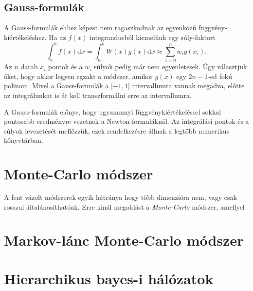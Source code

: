 \documentclass[12pt]{article}
\theoremstyle{plain}
\begin{document}
\subsection{Gauss-formulák}
A Gauss-formulák ehhez képest nem ragaszkodnak az egyenközű függvény-kiértékeléshez. Ha az $f(x)$ integrandusból kiemelünk egy súly-faktort
\begin{equation}
    \label{nc}
    \int_a^b f(x) \text{d}x  = \int_a^b W(x)g(x) \text{d}x \approx \sum_{i=0} ^n w_i g(x_i).
\end{equation}
Az $n$ darab $x_i$ pontok és a $w_i$ súlyok pedig már nem egyenletesek. Úgy választjuk őket, hogy akkor legyen egzakt a módszer, amikor $g(x)$ egy $2n-1$-ed fokú polinom. Mivel a Gauss-formulák a [$-1, 1$] intervallumra vannak megadva, előtte az integrálunkat is át kell transzformálni erre az intervallumra. 

A Gauss-formulák előnye, hogy ugyanannyi függvénykiértékeléssel sokkal pontosabb eredményre vezetnek a Newton-formuláknál. Az integrálási pontok és a súlyok levezetését mellőzzük, ezek rendelkezésre állnak a legtöbb numerikus könyvtárban. 
\section{Monte-Carlo módszer}
A fent vázolt módszerek egyik hátránya hogy több dimenzióra nem, vagy csak rosszul általánosíthatóak. Erre kínál megoldást a {\em Monte-Carlo} módszer, amellyel 
\section{Markov-lánc Monte-Carlo módszer}
\section{Hierarchikus bayes-i hálózatok}


\end{document}
